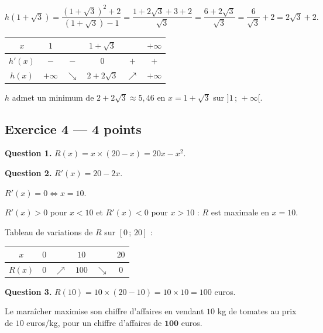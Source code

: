$h(1+\sqrt{3}) = \dfrac{(1+\sqrt{3})^2 + 2}{(1+\sqrt{3})-1} = \dfrac{1 + 2\sqrt{3} + 3 + 2}{\sqrt{3}} = \dfrac{6 + 2\sqrt{3}}{\sqrt{3}} = \dfrac{6}{\sqrt{3}} + 2 = 2\sqrt{3} + 2.$

\begin{center}
\begin{tabular}{|c|ccccc|}
\hline
$x$ & $1$ & & $1+\sqrt{3}$ & & $+\infty$ \\
\hline
$h'(x)$ & $-$ & $-$ & $0$ & $+$ & $+$ \\
\hline
$h(x)$ & $+\infty$ & $\searrow$ & $2+2\sqrt{3}$ & $\nearrow$ & $+\infty$ \\
\hline
\end{tabular}
\end{center}

$h$ admet un minimum de $2+2\sqrt{3} \approx 5{,}46$ en $x = 1+\sqrt{3}$ sur $]1\,;\,+\infty[$.

\subsection*{Exercice 4 — 4 points}


\textbf{Question 1.}
$R(x) = x \times (20 - x) = 20x - x^2.$

\textbf{Question 2.}
$R'(x) = 20 - 2x.$

$R'(x) = 0 \Leftrightarrow x = 10.$

$R'(x) > 0$ pour $x < 10$ et $R'(x) < 0$ pour $x > 10$ : $R$ est maximale en $x = 10$.

Tableau de variations de $R$ sur $[0\,;\,20]$ :

\begin{center}
\begin{tabular}{|c|ccccc|}
\hline
$x$ & $0$ & & $10$ & & $20$ \\
\hline
$R(x)$ & $0$ & $\nearrow$ & $100$ & $\searrow$ & $0$ \\
\hline
\end{tabular}
\end{center}

\textbf{Question 3.}
$R(10) = 10 \times (20 - 10) = 10 \times 10 = 100$ euros.

Le maraîcher maximise son chiffre d'affaires en vendant $10$ kg de tomates au prix de $10$ euros/kg, pour un chiffre d'affaires de $\mathbf{100}$ euros.

